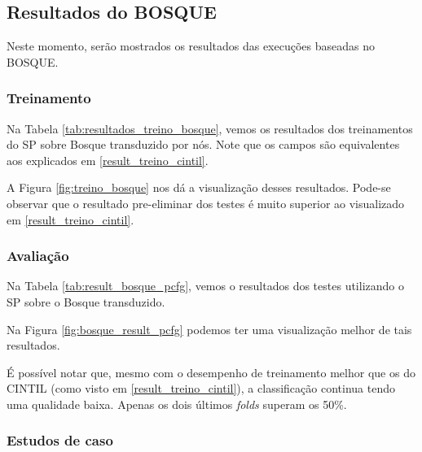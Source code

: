 \subsection{Resultados do BOSQUE}
\label{resultados_bosque}
Neste momento, serão mostrados os resultados das execuções baseadas no BOSQUE.

\subsubsection{Treinamento} \label{result_treino_bosque}
Na Tabela \ref{tab:resultados_treino_bosque}, vemos os resultados dos treinamentos do SP sobre Bosque transduzido por nós. Note que os campos são equivalentes aos explicados em \ref{result_treino_cintil}.
\begin{center}
    
\end{center}

A Figura \ref{fig:treino_bosque} nos dá a visualização desses resultados. Pode-se observar que o resultado pre-eliminar dos testes é muito superior ao visualizado em \ref{result_treino_cintil}.
\begin{center}
    
\end{center}

\subsubsection{Avaliação} \label{result_aval_bosque}
Na Tabela \ref{tab:result_bosque_pcfg}, vemos o resultados dos testes utilizando o SP sobre o Bosque transduzido.
\begin{center}
    
\end{center}

Na Figura \ref{fig:bosque_result_pcfg} podemos ter uma visualização melhor de tais resultados.
\begin{center}
    
\end{center}

É possível notar que, mesmo com o desempenho de treinamento melhor que os do CINTIL (como visto em \ref{result_treino_cintil}), a classificação continua tendo uma qualidade baixa. 
Apenas os dois últimos \textit{folds} superam os 50\%.

\subsubsection{Estudos de caso}
\label{subsec:ec-bosque}

